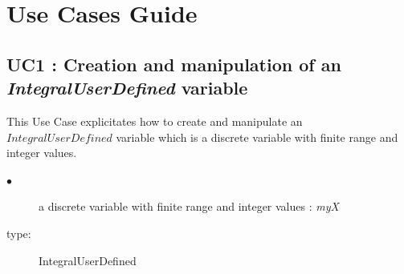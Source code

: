 % 




\section{Use Cases Guide}


\subsection{UC1 : Creation and manipulation of an {\itshape IntegralUserDefined} variable}

This Use Case explicitates how to create and manipulate an $IntegralUserDefined$ variable which is a discrete variable with finite range and integer values.
\espace



{
  \begin{description}
  \item[$\bullet$] a discrete variable with finite range and integer values : {\itshape myX}
  \item[type:] IntegralUserDefined
  \end{description}
}



